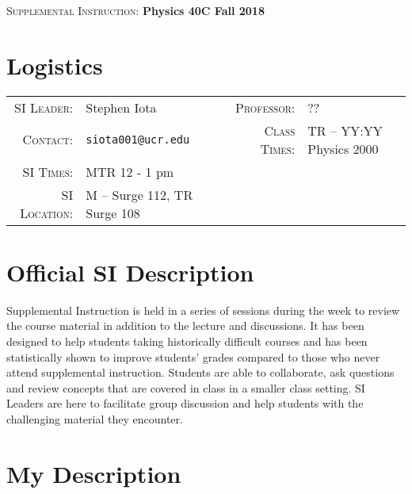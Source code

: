 \documentclass[11pt]{article}
\begin{document}


\begin{center}

\Large{
\textsc{Supplemental Instruction}: \textbf{Physics 40C Fall 2018}
}	
\end{center}





\section*{Logistics}

\begin{tabular}{rlrl}

\textsc{SI Leader}:
&
Stephen Iota
&
\textsc{Professor}:
&
??
\\
\textsc{Contact}:
&
\texttt{siota001@ucr.edu}
&
\textsc{Class Times}:
&
TR -- YY:YY Physics 2000
\\
\textsc{SI Times}:
&
MTR 12 - 1 pm
\\
\textsc{SI Location}:
&
M -- Surge 112, TR Surge 108
\\
\end{tabular}







\section*{Official SI Description}
Supplemental Instruction is held in a series of sessions during the week to review the course material in addition to the lecture and discussions. It has been designed to help students taking historically difficult courses and has been statistically shown to improve students' grades compared to those who never attend supplemental instruction. Students are able to collaborate, ask questions and review concepts that are covered in class in a smaller class setting. SI Leaders are here to facilitate group discussion and help students with the challenging material they encounter. 

\section*{My Description}
\end{document}
